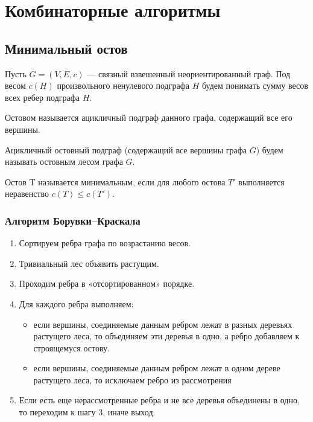 \section{Комбинаторные алгоритмы}
\subsection{Минимальный остов}
Пусть $G = (V,E,c)$ — связный взвешенный неориентированный граф. Под весом $c(H)$ произвольного ненулевого подграфа $H$ будем понимать сумму весов всех ребер подграфа $H$.

Остовом называется ацикличный подграф данного графа, содержащий все его вершины.

Ацикличный остовный подграф (содержащий все вершины графа $G$) будем называть остовным лесом графа $G$.

Остов T называется минимальным, если для любого остова $T'$ выполняется неравенство $c(T) \le  c(T')$.
\subsubsection{Алгоритм Борувки–Краскала}
\begin{enumerate}
	\item Сортируем ребра графа по возрастанию весов.
    \item Тривиальный лес объявить растущим.
    \item Проходим ребра в «отсортированном» порядке.
    \item Для каждого ребра выполняем: \begin{itemize}
    	\item если вершины, соединяемые данным ребром лежат в разных деревьях растущего леса, то объединяем эти деревья в одно, а ребро добавляем к строящемуся остову.
    	\item если вершины, соединяемые данным ребром лежат в одном дереве растущего леса, то исключаем ребро из рассмотрения
    	
    	\end{itemize}
    \item Если есть еще нерассмотренные ребра и не все деревья объединены в одно, то переходим к шагу 3, иначе выход.
\end{enumerate}

